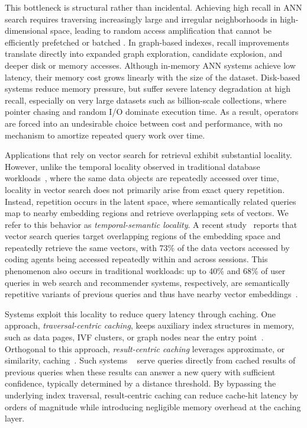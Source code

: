 This bottleneck is structural rather than incidental. Achieving high recall in ANN search requires traversing increasingly large and irregular neighborhoods in high-dimensional space, leading to random access amplification that cannot be efficiently prefetched or batched \cite{aker}. In graph-based indexes, recall improvements translate directly into expanded graph exploration, candidate explosion, and deeper disk or memory accesses. Although in-memory ANN systems achieve low latency, their memory cost grows linearly with the size of the dataset. Disk-based systems reduce memory pressure, but suffer severe latency degradation at high recall, especially on very large datasets such as billion-scale collections, where pointer chasing and random I/O \cite{jaiswal2022ooddiskannefficientscalablegraph} dominate execution time.  As a result, operators are forced into an undesirable choice between cost and performance, with no mechanism to amortize repeated query work over time. 

Applications that rely on vector search for retrieval exhibit substantial locality. However, unlike the temporal locality observed in traditional database workloads~\cite{chandramouli2018faster}, where the same data objects are repeatedly accessed over time, locality in vector search does not primarily arise from exact query repetition. Instead, repetition occurs in the latent space, where semantically related queries map to nearby embedding regions and retrieve overlapping sets of vectors. We refer to this behavior as \emph{temporal-semantic locality}. A recent study~\cite{lee2026characterizing} reports that vector search queries target overlapping regions of the embedding space and repeatedly retrieve the same vectors, with 73\% of the data vectors accessed by coding agents being accessed repeatedly within and across sessions. This phenomenon also occurs in traditional workloads: up to 40\% and 68\% of user queries in web search and recommender systems, respectively, are semantically repetitive variants of previous queries and thus have nearby vector embeddings~\cite{10.1145/1277741.1277770yahoo, gill2025advancingsemanticcachingllms, li2024recommenderpurposerepeatexploration}.

Systems exploit this locality to reduce query latency through caching. One approach, \emph{traversal-centric caching}, keeps auxiliary index structures in memory, such as data pages, IVF clusters, or graph nodes near the entry point~\cite{pgvector, diskann, 3495724.3496619, 10.1145/3318464.3386131}. Orthogonal to this approach, \emph{result-centric caching} leverages approximate, or similarity, caching~\cite{similarity-caching, similarity-caching-theory-algorithms}. Such systems ~\cite{aker} serve queries directly from cached results of previous queries when these results can answer a new query with sufficient confidence, typically determined by a distance threshold. By bypassing the underlying index traversal, result-centric caching can reduce cache-hit latency by orders of magnitude while introducing negligible memory overhead at the caching layer.

